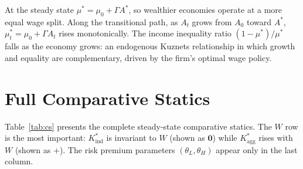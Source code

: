 \documentclass[12pt,a4paper]{article}
\begin{document}
At the steady state $\mu^* = \mu_0 + \Gamma A^*$, so wealthier
economies operate at a more equal wage split. Along the transitional
path, as $A_t$ grows from $A_0$ toward $A^*$, $\mu_t^* = \mu_0 +
\Gamma A_t$ rises monotonically. The income inequality ratio
$(1-\mu^*)/\mu^*$ falls as the economy grows: an endogenous Kuznets
relationship in which growth and equality are complementary, driven by
the firm's optimal wage policy.

\section{Full Comparative Statics}

Table~\ref{tab:cs} presents the complete steady-state comparative
statics. The $W$ row is the most important: $K^*_{\mathrm{ind}}$ is
invariant to $W$ (shown as $\mathbf{0}$) while $K^*_{\mathrm{agg}}$
rises with $W$ (shown as $+$). The risk premium parameters
$(\theta_L,\theta_H)$ appear only in the last column.
\end{document}

